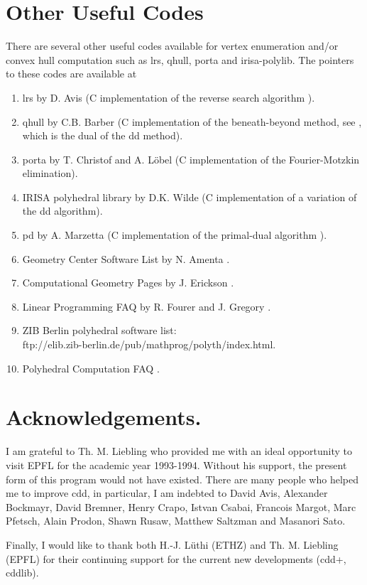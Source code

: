 \documentclass[11pt]{article}
\newcommand {\0} {{\bf 0}}
\begin{document}
\section{Other Useful Codes}  \label{CODES}
There are several other useful codes available for vertex enumeration and/or
convex hull computation  such as lrs, qhull, porta and irisa-polylib.
The pointers to these codes are available at
\begin{enumerate}
\item lrs by D. Avis \cite{a-uglrs-97} (C implementation of the reverse search algorithm 
\cite{af-pachv-92}). 

\item qhull by C.B. Barber \cite{bdh-qach-95} (C implementation of
the beneath-beyond method, see \cite{e-acg-87,m-cg-94},
which is the dual of the dd method). 

\item porta by T. Christof and A. L{\"o}bel \cite{cl-porta-97} (C implementation
of the Fourier-Motzkin elimination).

\item IRISA polyhedral library by D.K. Wilde
\cite{w-ldpo-93b} (C implementation
of a variation of the dd algorithm).

\item pd by A. Marzetta \cite{m-pdcip-97} (C implementation of the primal-dual algorithm 
\cite{bfm-pdmvf-97}). 

 \item Geometry Center Software List by N. Amenta \cite{a-dcg}.

 \item Computational Geometry Pages by J. Erickson \cite{e-cgp}.

 \item Linear Programming FAQ by R. Fourer and J. Gregory \cite{fg-lpfaq-97}.

 \item ZIB Berlin polyhedral software list:\\
{ftp://elib.zib-berlin.de/pub/mathprog/polyth/index.html}.

\item Polyhedral Computation FAQ \cite{f-pcfaq-98}.
\end{enumerate}


\section*{Acknowledgements.} 
I am  grateful to Th. M. Liebling who
provided me with an ideal opportunity to visit EPFL
for the academic year 1993-1994.  Without his 
support, the present form of this program would not have existed.
There are many people who helped me to improve cdd, in particular,
I am indebted to David Avis, 
Alexander Bockmayr, David Bremner, Henry Crapo, Istvan Csabai, 
Francois Margot, Marc Pfetsch, Alain Prodon, 
Shawn Rusaw, Matthew Saltzman and Masanori Sato.

Finally, I would like to thank both H.-J. L\"uthi (ETHZ)
 and Th. M. Liebling (EPFL) for their continuing support for 
the current new developments (cdd+, cddlib).  




\end{document}
